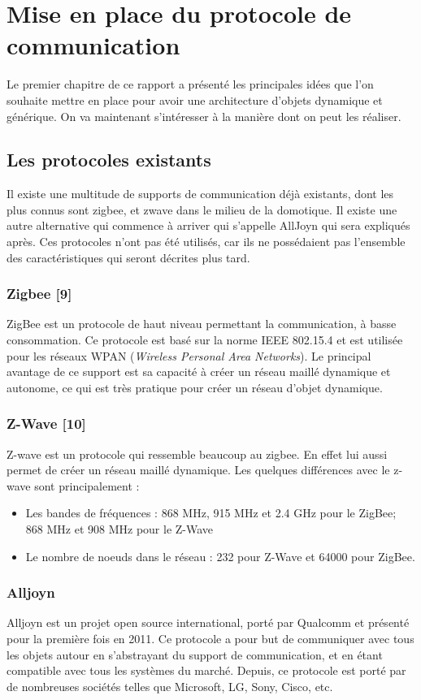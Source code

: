 ﻿\chapter{Mise en place du protocole de communication}
	Le premier chapitre de ce rapport a présenté les principales idées que l'on souhaite mettre en 
	place pour avoir une architecture d'objets dynamique et générique. On va maintenant s'intéresser
	à la manière dont on peut les réaliser.


\section{Les protocoles existants}
	Il existe une multitude de supports de communication déjà existants, dont les plus connus sont 
	zigbee, et zwave dans le milieu de la domotique. Il existe une autre alternative qui commence à 
	arriver qui s'appelle AllJoyn qui sera expliqués après. Ces protocoles n'ont pas été utilisés, 
	car ils ne possédaient pas l'ensemble des caractéristiques qui seront décrites plus tard. 

	\subsection{Zigbee [9]}
		ZigBee est un protocole de haut niveau permettant la communication, à basse consommation. Ce 
		protocole est basé sur la norme IEEE 802.15.4 et est utilisée pour les réseaux WPAN 
		(\emph{Wireless Personal 
		Area Networks}). Le principal avantage de ce support est sa capacité à créer un réseau 
		maillé dynamique et autonome, ce qui est très pratique pour créer un réseau d'objet dynamique.
		
	\subsection{Z-Wave [10]}
	Z-wave est un protocole qui ressemble beaucoup au zigbee. En effet lui aussi permet de créer un 
	réseau maillé dynamique. Les quelques différences avec le z-wave sont principalement :

\begin{itemize}
 \item Les bandes de fréquences : 868 MHz, 915 MHz et 2.4 GHz pour le ZigBee; 868 MHz et 908 MHz pour le 
Z-Wave
\item Le nombre de noeuds dans le réseau : 232 pour Z-Wave et 64000 pour ZigBee.
\end{itemize}

	\subsection{Alljoyn}
	Alljoyn est un projet open source international, porté par Qualcomm et présenté pour la première fois en 2011. Ce protocole a pour but de communiquer avec tous les objets autour en s'abstrayant du support de communication, et en étant compatible avec tous les systèmes du marché. Depuis, ce protocole est porté par de nombreuses sociétés telles que Microsoft, LG, Sony, Cisco, etc.

